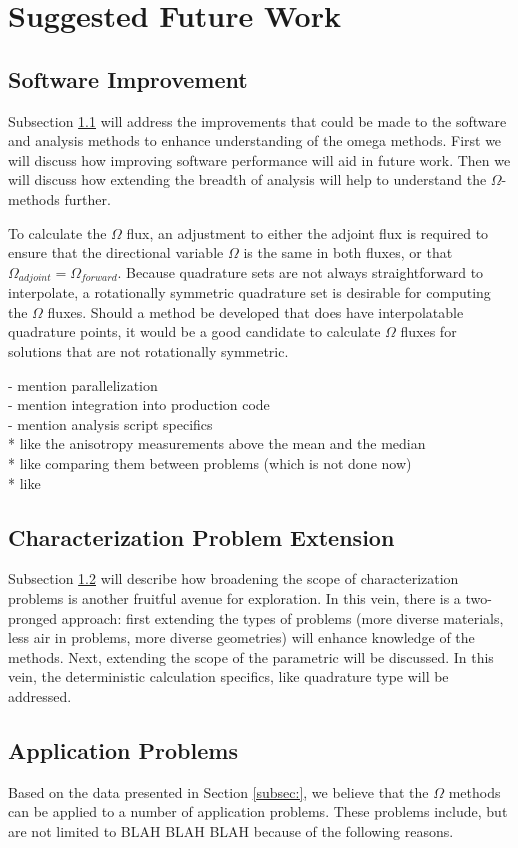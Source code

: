 \section{Suggested Future Work}
\label{sec:futurewrk}

\subsection{Software Improvement}
\label{subsec:softwareimp}

Subsection \ref{subsec:softwareimp} will address the improvements that could be
made to the software and analysis methods to enhance understanding of the omega
methods. First we will discuss how improving software performance will aid in
future work. Then we will discuss how extending the breadth of analysis will
help to understand the $\Omega$-methods further.

To calculate the $\Omega$ flux, an adjustment to either the adjoint flux is
required to ensure that the directional variable $\Omega$ is the same in both
fluxes, or that $\Omega_{adjoint} = \Omega_{forward}$. Because quadrature sets
are not always straightforward to interpolate, a rotationally symmetric
quadrature set is desirable for computing the $\Omega$ fluxes. Should a method
be developed that does have interpolatable quadrature points, it would be a good
candidate to calculate $\Omega$ fluxes for solutions that are not
rotationally symmetric.

- mention parallelization \\
- mention integration into production code \\
- mention analysis script specifics \\
* like the anisotropy measurements above the mean and the median \\
* like comparing them between problems (which is not done now) \\
* like

\subsection{Characterization Problem Extension}
\label{subsec:extendcharprobs}

Subsection \ref{subsec:extendcharprobs} will describe how broadening the scope
of characterization problems is another fruitful avenue for exploration. In this
vein, there is a two-pronged approach: first extending the types of problems
(more diverse materials, less air in problems, more diverse geometries) will
enhance knowledge of the methods. Next, extending the scope of the parametric
will be discussed. In this vein, the deterministic calculation specifics, like
quadrature type will be addressed.


\subsection{Application Problems}
\label{subsec:appprobs}

Based on the data presented in Section \ref{subsec:}, we believe that the
$\Omega$ methods can be applied to a number of application problems. These
problems include, but are not limited to BLAH BLAH BLAH because of the following reasons.
